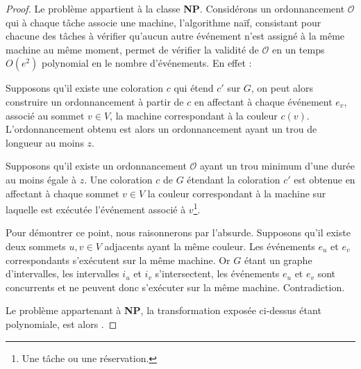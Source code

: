 \begin{proof}
Le problème \fischedpi{} appartient à la classe \textbf{NP}.
Considérons un ordonnancement $\mathcal{O}$ qui à chaque tâche associe une machine, l'algorithme
naïf, consistant pour chacune des tâches à vérifier qu'aucun autre événement n'est assigné à la
même machine au même moment, permet de vérifier la validité de $\mathcal{O}$ en un temps
$O(e^2)$ polynomial en le nombre d'événements. En effet :
\begin{bitemize}
    \item Supposons qu'il existe une coloration $c$ qui étend $c'$ sur $G$, on peut alors
        construire un ordonnancement à partir de $c$ en affectant à chaque événement $e_v$,
        associé au sommet $v \in V$, la machine correspondant à la couleur $c(v)$.
        L'ordonnancement obtenu est alors un ordonnancement ayant un trou de longueur au moins
        $z$.

    \item Supposons qu'il existe un ordonnancement $\mathcal{O}$ ayant un trou minimum d'une durée au
        moins égale à $z$. Une coloration $c$ de $G$ étendant la coloration $c'$ est obtenue en
        affectant à chaque sommet $v \in V$ la couleur correspondant à la machine
        sur laquelle est exécutée l'événement associé à $v$\footnote{Une tâche ou une
        réservation.}.
        
        Pour démontrer ce point, nous raisonnerons par l'absurde. Supposons qu'il existe deux
        sommets $u, v \in V$ adjacents ayant la même couleur. Les événements $e_u$ et $e_v$
        correspondants s'exécutent sur la même machine. Or $G$ étant un graphe d'intervalles,
        les intervalles $i_u$ et $i_v$ s'intersectent, les événements $e_u$ et $e_v$ sont
        concurrents et ne peuvent donc s'exécuter sur la même machine. Contradiction.


\end{bitemize}

Le problème \fischedpi{} appartenant à \textbf{NP}, la
transformation exposée ci-dessus étant polynomiale, \fischedpi{} est alors \npc{}.
\end{proof}

